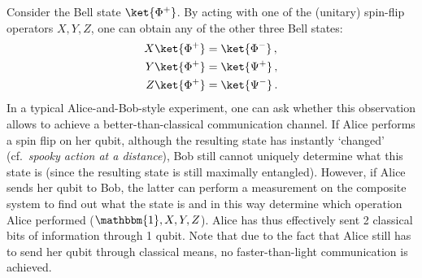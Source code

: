 
    \begin{method}
        Consider the Bell state $\ket{\Phi^+}$. By acting with one of the (unitary) spin-flip operators $X,Y,Z$, one can obtain any of the other three Bell states:
        \begin{gather}
            \begin{aligned}
                X\ket{\Phi^+} &= \ket{\Phi^-}\,,\\
                Y\ket{\Phi^+} &= \ket{\Psi^+}\,,\\
                Z\ket{\Phi^+} &= \ket{\Psi^-}\,.
            \end{aligned}
        \end{gather}
        In a typical Alice-and-Bob-style experiment, one can ask whether this observation allows to achieve a better-than-classical communication channel. If Alice performs a spin flip on her qubit, although the resulting state has instantly `changed' (cf.~\textit{spooky action at a distance}), Bob still cannot uniquely determine what this state is (since the resulting state is still maximally entangled). However, if Alice sends her qubit to Bob, the latter can perform a measurement on the composite system to find out what the state is and in this way determine which operation Alice performed ($\mathbbm{1},X,Y,Z$). Alice has thus effectively sent 2 classical bits of information through 1 qubit. Note that due to the fact that Alice still has to send her qubit through classical means, no faster-than-light communication is achieved.
    \end{method}

